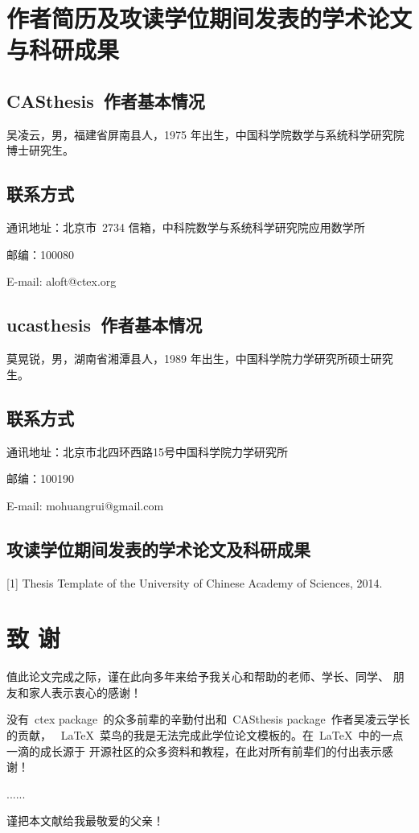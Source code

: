\chapter{作者简历及攻读学位期间发表的学术论文与科研成果}

\section*{CASthesis~作者基本情况}

吴凌云，男，福建省屏南县人，1975 年出生，中国科学院数学与系统科学研究院博士研究生。

\section*{联系方式}

通讯地址：北京市~2734 信箱，中科院数学与系统科学研究院应用数学所

邮编：100080

E-mail: aloft@ctex.org

\section*{ucasthesis~作者基本情况}

莫晃锐，男，湖南省湘潭县人，1989 年出生，中国科学院力学研究所硕士研究生。

\section*{联系方式}

通讯地址：北京市北四环西路15号中国科学院力学研究所

邮编：100190

E-mail: mohuangrui@gmail.com

\section*{攻读学位期间发表的学术论文及科研成果}

[1] Thesis Template of the University of Chinese Academy of Sciences, 2014.

\chapter{致 \quad 谢}

值此论文完成之际，谨在此向多年来给予我关心和帮助的老师、学长、同学、
朋友和家人表示衷心的感谢！

没有~ctex package~的众多前辈的辛勤付出和~CASthesis package~作者吴凌云学长的贡献，
~\LaTeX{}~菜鸟的我是无法完成此学位论文模板的。在~\LaTeX{}~中的一点一滴的成长源于
开源社区的众多资料和教程，在此对所有前辈们的付出表示感谢！

......

谨把本文献给我最敬爱的父亲！
